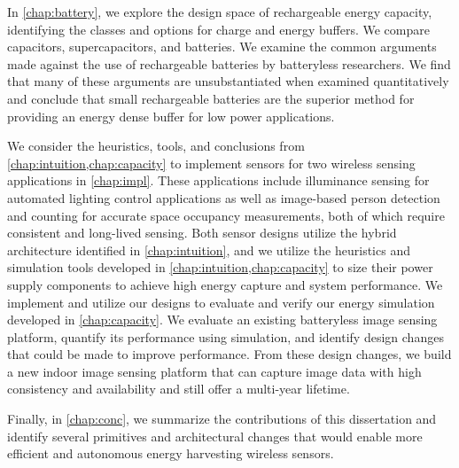 In \cref{chap:battery}, we explore the design space of rechargeable energy capacity, identifying the classes and options for charge and energy buffers. We compare capacitors, supercapacitors, and batteries. We examine the common arguments made against the use of rechargeable batteries by batteryless researchers.
We find that many of these arguments are unsubstantiated when examined quantitatively and conclude that small rechargeable batteries are the superior method for providing an energy dense buffer for low power applications.

We consider the heuristics, tools, and conclusions from \cref{chap:intuition,chap:capacity} to implement sensors for two wireless sensing applications in \cref{chap:impl}. 
These applications include illuminance sensing for automated lighting control applications as well as image-based person detection and counting for accurate space occupancy measurements, both of which require consistent and long-lived sensing. 
Both sensor designs utilize the hybrid architecture identified in \cref{chap:intuition}, and we utilize the heuristics and simulation tools developed in \cref{chap:intuition,chap:capacity} to size their power supply components to achieve high energy capture and system performance. 
We implement and utilize our designs to evaluate and verify our energy simulation developed in \cref{chap:capacity}. 
We evaluate an existing batteryless image sensing platform, quantify its performance using simulation, and identify design changes that could be made to improve performance.
From these design changes, we build a new indoor image sensing platform that can capture image data with high consistency and availability and still offer a multi-year lifetime. 

Finally, in \cref{chap:conc}, we summarize the contributions of this dissertation and identify several primitives and architectural changes that would enable more efficient and autonomous energy harvesting wireless sensors. 

